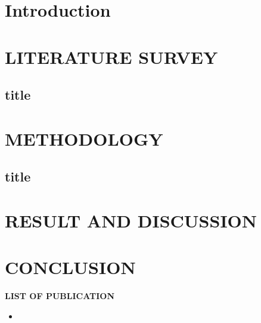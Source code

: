 \documentclass[a4paper, 12pt]{report}
\begin{document}
			
			
			
			
			
			
			
			
			
			
			
			
\chapter{Introduction}
\setcounter{page}{1}

\chapter{\MakeUppercase{Literature survey}}

\section{title}

\chapter{\MakeUppercase{Methodology}}

\section{title}

\chapter{\MakeUppercase{Result And Discussion}}








\chapter{\MakeUppercase{Conclusion}}





\newpage
\begin{center}
	{\MakeUppercase{\bfseries List Of Publication}}
\end{center}
\begin{itemize}
	\item 
\end{itemize}



			
			
			
			
			
			
			
			
			
			
\end{document}
